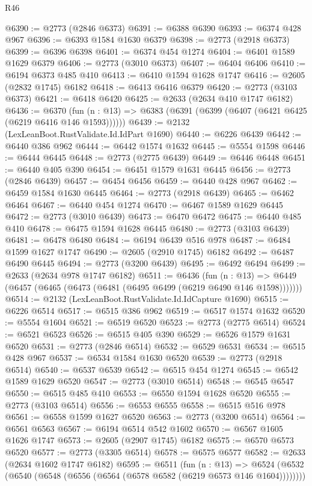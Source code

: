 \begin{lexlean}{R46}
\begin{coremodule}
@6390 := @2773 (@2846 @6373)
@6391 := @6388 @6390
@6393 := @6374 @428 @967
@6396 := @6393 @1584 @1630 @6379
@6398 := @2773 (@2918 @6373)
@6399 := @6396 @6398
@6401 := @6374 @454 @1274
@6404 := @6401 @1589 @1629 @6379
@6406 := @2773 (@3010 @6373)
@6407 := @6404 @6406
@6410 := @6194 @6373 @485 @410
@6413 := @6410 @1594 @1628 @1747
@6416 := @2605 (@2832 @1745) @6182
@6418 := @6413 @6416 @6379
@6420 := @2773 (@3103 @6373)
@6421 := @6418 @6420
@6425 := @2633 (@2634 @410 @1747 @6182)
@6436 := @6370
    (fun (n : @13) => @6383 (@6391 (@6399 (@6407 (@6421 @6425 (@6219 @6416 @146 @1593))))))
@6439 := @2132 (LexLeanBoot.RustValidate.Id.IdPart @1690)
@6440 := @6226 @6439
@6442 := @6440 @386 @962
@6444 := @6442 @1574 @1632
@6445 := @5554 @1598
@6446 := @6444 @6445
@6448 := @2773 (@2775 @6439)
@6449 := @6446 @6448
@6451 := @6440 @405 @390
@6454 := @6451 @1579 @1631 @6445
@6456 := @2773 (@2846 @6439)
@6457 := @6454 @6456
@6459 := @6440 @428 @967
@6462 := @6459 @1584 @1630 @6445
@6464 := @2773 (@2918 @6439)
@6465 := @6462 @6464
@6467 := @6440 @454 @1274
@6470 := @6467 @1589 @1629 @6445
@6472 := @2773 (@3010 @6439)
@6473 := @6470 @6472
@6475 := @6440 @485 @410
@6478 := @6475 @1594 @1628 @6445
@6480 := @2773 (@3103 @6439)
@6481 := @6478 @6480
@6484 := @6194 @6439 @516 @978
@6487 := @6484 @1599 @1627 @1747
@6490 := @2605 (@2910 @1745) @6182
@6492 := @6487 @6490 @6445
@6494 := @2773 (@3200 @6439)
@6495 := @6492 @6494
@6499 := @2633 (@2634 @978 @1747 @6182)
@6511 := @6436
    (fun (n : @13) => @6449 (@6457 (@6465 (@6473 (@6481 (@6495 @6499 (@6219 @6490 @146 @1598)))))))
@6514 := @2132 (LexLeanBoot.RustValidate.Id.IdCapture @1690)
@6515 := @6226 @6514
@6517 := @6515 @386 @962
@6519 := @6517 @1574 @1632
@6520 := @5554 @1604
@6521 := @6519 @6520
@6523 := @2773 (@2775 @6514)
@6524 := @6521 @6523
@6526 := @6515 @405 @390
@6529 := @6526 @1579 @1631 @6520
@6531 := @2773 (@2846 @6514)
@6532 := @6529 @6531
@6534 := @6515 @428 @967
@6537 := @6534 @1584 @1630 @6520
@6539 := @2773 (@2918 @6514)
@6540 := @6537 @6539
@6542 := @6515 @454 @1274
@6545 := @6542 @1589 @1629 @6520
@6547 := @2773 (@3010 @6514)
@6548 := @6545 @6547
@6550 := @6515 @485 @410
@6553 := @6550 @1594 @1628 @6520
@6555 := @2773 (@3103 @6514)
@6556 := @6553 @6555
@6558 := @6515 @516 @978
@6561 := @6558 @1599 @1627 @6520
@6563 := @2773 (@3200 @6514)
@6564 := @6561 @6563
@6567 := @6194 @6514 @542 @1602
@6570 := @6567 @1605 @1626 @1747
@6573 := @2605 (@2907 @1745) @6182
@6575 := @6570 @6573 @6520
@6577 := @2773 (@3305 @6514)
@6578 := @6575 @6577
@6582 := @2633 (@2634 @1602 @1747 @6182)
@6595 := @6511
    (fun (n : @13) =>
    @6524 (@6532 (@6540 (@6548 (@6556 (@6564 (@6578 @6582 (@6219 @6573 @146 @1604))))))))

\end{coremodule}
\end{lexlean}

